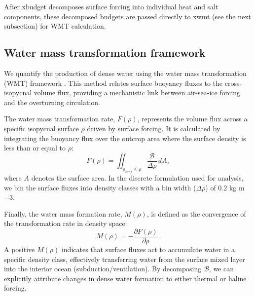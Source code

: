 \documentclass[draft]{agujournal2025}
\begin{document}
After xbudget decomposes surface forcing into individual heat and salt components, these decomposed budgets are passed directly to xwmt (see the next subsection) for WMT calculation.


\subsection{Water mass transformation framework}

We quantify the production of dense water using the water mass transformation (WMT) framework \citep{Walin1982,Speer1992}. This method relates surface buoyancy fluxes to the cross-isopycnal volume flux, providing a mechanistic link between air-sea-ice forcing and the overturning circulation.

The water mass transformation rate, $F(\rho)$, represents the volume flux across a specific isopycnal surface $\rho$ driven by surface forcing. It is calculated by integrating the buoyancy flux over the outcrop area where the surface density is less than or equal to $\rho$:
\begin{equation}
F(\rho) = \iint_{\rho_{surf} \le \rho} \frac{\mathcal{B}}{\Delta \rho} \, dA,
\end{equation}
where $A$ denotes the surface area. In the discrete formulation used for analysis, we bin the surface fluxes into density classes with a bin width ($\Delta \rho$) of 0.2 kg m${-3}$.

Finally, the water mass formation rate, $M(\rho)$, is defined as the convergence of the transformation rate in density space:
\begin{equation}
M(\rho) = - \frac{\partial F(\rho)}{\partial \rho}.
\end{equation}
A positive $M(\rho)$ indicates that surface fluxes act to accumulate water in a specific density class, effectively transferring water from the surface mixed layer into the interior ocean (subduction/ventilation). By decomposing $\mathcal{B}$, we can explicitly attribute changes in dense water formation to either thermal  or haline forcing.
\end{document}
